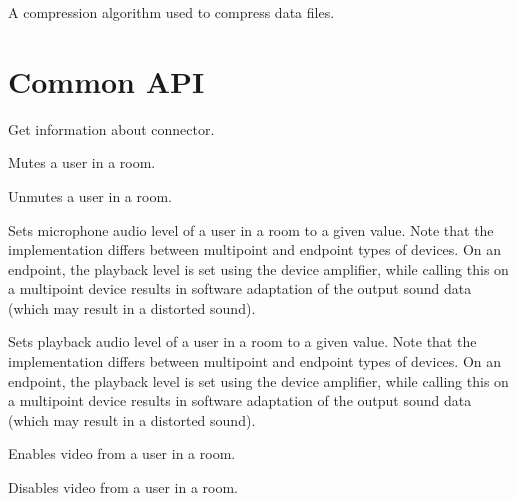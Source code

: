 \begin{Api}
A compression algorithm used to compress data files.
\begin{ApiEnumValues}
\end{ApiEnumValues}


\end{Api}


\section{Common API}

\begin{Api}

Get information about connector.

Mutes a user in a room.

Unmutes a user in a room.

Sets microphone audio level of a user in a room to a given value. Note that the implementation differs between multipoint and endpoint types of devices. On an endpoint, the playback level is set using the device amplifier, while calling this on a multipoint device results in software adaptation of the output sound data (which may result in a distorted sound).

Sets playback audio level of a user in a room to a given value. Note that the implementation differs between multipoint and endpoint types of devices. On an endpoint, the playback level is set using the device amplifier, while calling this on a multipoint device results in software adaptation of the output sound data (which may result in a distorted sound).

Enables video from a user in a room.

Disables video from a user in a room.

\end{Api}

